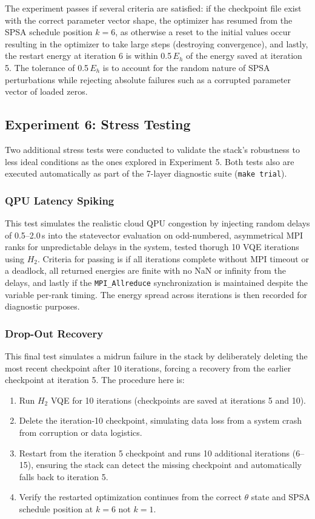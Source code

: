 The experiment passes if several criteria are satisfied: if the checkpoint file exist with the correct parameter vector shape, the optimizer has
resumed from the SPSA schedule position $k=6$, as otherwise a reset to the initial values occur resulting in the optimizer to take large steps (destroying convergence), 
and lastly, the restart energy at iteration 6 is within 0.5\,$E_h$ of the energy saved at iteration 5. 
The tolerance of 0.5\,$E_h$ is to account for the random nature of SPSA perturbations while rejecting absolute failures such as a corrupted parameter vector of loaded zeros.

\subsection{Experiment 6: Stress Testing}
Two additional stress tests were conducted to validate the stack's robustness to less ideal conditions as the ones explored in Experiment 5. 
Both tests also are executed automatically as part of the 7-layer diagnostic suite (\texttt{make trial}).

\subsubsection{QPU Latency Spiking}
This test simulates the realistic cloud QPU congestion by injecting random delays of 0.5--2.0\,s into the statevector 
evaluation on odd-numbered, asymmetrical MPI ranks for unpredictable delays in the system, tested thorugh 10 VQE iterations using $H_{2}$.  
Criteria for passing is if all iterations complete without MPI timeout or a deadlock, all returned energies are finite 
with no NaN or infinity from the delays, and lastly if the \texttt{MPI\_Allreduce} synchronization is maintained despite the variable per-rank timing. 
The energy spread across iterations is then recorded for diagnostic purposes. 

\subsubsection{Drop-Out Recovery}
This final test simulates a midrun failure in the stack by deliberately deleting the most recent checkpoint after 10 iterations, 
forcing a recovery from the earlier checkpoint at iteration 5. The procedure here is:
\begin{enumerate}
    \item Run $H_{2}$ VQE for 10 iterations (checkpoints are saved at iterations 5 and 10).
    \item Delete the iteration-10 checkpoint, simulating data loss from a system crash from corruption or data logistics.
    \item Restart from the iteration 5 checkpoint and runs 10 additional iterations (6--15), ensuring the stack can detect the missing checkpoint and automatically falls back to iteration 5.
    \item Verify the restarted optimization continues from the correct $\theta$ state and SPSA schedule position at $k=6$ not $k=1$.
\end{enumerate}

